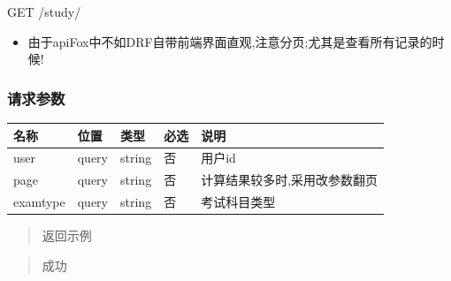 \documentclass[
]{article}
\begin{document}
GET /study/

\begin{itemize}
\item
  由于apiFox中不如DRF自带前端界面直观,注意分页;尤其是查看所有记录的时候!
\end{itemize}

\hypertarget{ux8bf7ux6c42ux53c2ux6570-12}{%
\subsubsection{请求参数}\label{ux8bf7ux6c42ux53c2ux6570-12}}

\begin{longtable}[]{@{}lllll@{}}
\toprule
名称 & 位置 & 类型 & 必选 & 说明 \\
\midrule
\endhead
user & query & string & 否 & 用户id \\
page & query & string & 否 & 计算结果较多时,采用改参数翻页 \\
examtype & query & string & 否 & 考试科目类型 \\
\bottomrule
\end{longtable}

\begin{quote}
返回示例
\end{quote}

\begin{quote}
成功
\end{quote}
\end{document}

